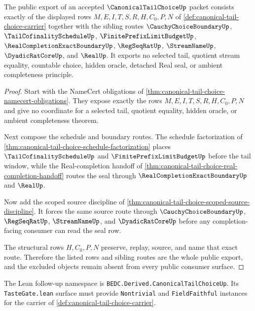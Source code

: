 \begin{theorem}
\label{thm:canonical-tail-choice-public-export}
The public export of an accepted $\CanonicalTailChoiceUp$ packet consists exactly of the displayed rows $M,E,I,T,S,R,H,C_0,P,N$ of \autoref{def:canonical-tail-choice-carrier} together with the sibling routes $\CauchyChoiceBoundaryUp$, $\TailCofinalityScheduleUp$, $\FinitePrefixLimitBudgetUp$, $\RealCompletionExactBoundaryUp$, $\RegSeqRatUp$, $\StreamNameUp$, $\DyadicRatCoreUp$, and $\RealUp$. It exports no selected tail, quotient stream equality, countable choice, hidden oracle, detached Real seal, or ambient completeness principle.
\end{theorem}
\begin{proof}
Start with the NameCert obligations of \autoref{thm:canonical-tail-choice-namecert-obligations}. They expose exactly the rows $M,E,I,T,S,R,H,C_0,P,N$ and give no coordinate for a selected tail, quotient equality, hidden oracle, or ambient completeness theorem.

Next compose the schedule and boundary routes. The schedule factorization of \autoref{thm:canonical-tail-choice-schedule-factorization} places $\TailCofinalityScheduleUp$ and $\FinitePrefixLimitBudgetUp$ before the tail window, while the Real-completion handoff of \autoref{thm:canonical-tail-choice-real-completion-handoff} routes the seal through $\RealCompletionExactBoundaryUp$ and $\RealUp$.

Now add the scoped source discipline of \autoref{thm:canonical-tail-choice-scoped-source-discipline}. It forces the same source route through $\CauchyChoiceBoundaryUp$, $\RegSeqRatUp$, $\StreamNameUp$, and $\DyadicRatCoreUp$ before any completion-facing consumer can read the seal row.

The structural rows $H,C_0,P,N$ preserve, replay, source, and name that exact route. Therefore the listed rows and sibling routes are the whole public export, and the excluded objects remain absent from every public consumer surface.
\end{proof}

The Lean follow-up namespace is \texttt{BEDC.Derived.CanonicalTailChoiceUp}. Its \texttt{TasteGate.lean} surface must provide \texttt{Nontrivial} and \texttt{FieldFaithful} instances for the carrier of \autoref{def:canonical-tail-choice-carrier}.


